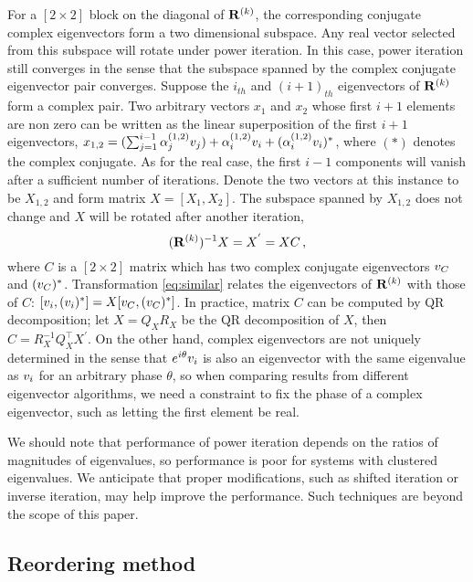 \documentclass[final,leqno,onefignum,onetabnum]{siamltexmm}
\begin{document}
For a $[2\!\times\! 2]$ block on the diagonal of $\mathbf{R}^{(k)}$, the
corresponding conjugate complex eigenvectors form a two dimensional subspace.
Any real vector selected from this subspace will rotate under power
iteration. In this case, power iteration still converges in the sense
that the subspace spanned by the complex
conjugate eigenvector pair converges.
Suppose the $i_{th}$ and $(i+1)_{th}$ eigenvectors of $\mathbf{R}^{(k)}$ form a
complex pair. Two arbitrary vectors $x_{1}$ and $x_{2}$ whose first $i+1$
elements are non zero can be written as the linear superposition of the
first $i+1$ eigenvectors,
$x_{1,2}=(\sum_{j=1}^{i-1}\alpha^{(1,2)}_{j}v_{j})+\alpha^{(1,2)}_{i}v_{i}+
(\alpha^{(1,2)}_{i}v_{i})^{*}
$,
where $(*)$ denotes the complex conjugate. As for the real case, the
first $i\!-\!1$ components will vanish after a sufficient number of
iterations. Denote the two vectors at this instance to be $X_{1, 2}$
and form matrix $X=[X_{1},X_{2}]$.
The subspace spanned by $X_{1,2}$ does not change and $X$ will be rotated
after another iteration,
\begin{equation}
(\ps{R}{k})^{-1}X=X^{'}=XC
\,,
\label{eq:similar}
\end{equation}
where $C$ is a $[2\!\times\! 2]$ matrix which has two complex conjugate
eigenvectors $v_{C}$ and $(v_{C})^{*}$. Transformation
\eqref{eq:similar} relates the eigenvectors of $\mathbf{R}^{(k)}$ with those of
$C$: $[v_{i},(v_{i})^{*}]=X[v_{C},(v_{C})^{*}]$.
In practice, matrix $C$ can be computed by QR decomposition; let
$X=Q_{X}R_{X}$ be the QR decomposition of $X$, then
$C=R_{X}^{-1}Q_{X}^\top X^{'}$.
On the other hand,
complex eigenvectors are not uniquely determined in the sense that
$e^{i\theta}v_{i}$ is also an eigenvector with the same eigenvalue
as $v_{i}$ for an arbitrary {phase} $\theta$, so when comparing
results from different eigenvector algorithms, we need a constraint to
fix the phase of a complex eigenvector, such as letting the first element
be real.

We should note that performance of power iteration depends on the ratios
of magnitudes of eigenvalues, so performance is poor for systems with
clustered eigenvalues. We {anticipate that proper modifications,
such as shifted iteration or inverse iteration, may help
improve the performance}.
Such techniques are beyond the scope of this paper.

\subsection{Reordering method}
\label{sect:reorder}
\end{document}
